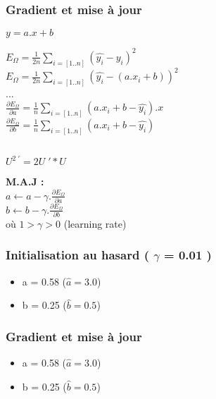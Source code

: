 \begin{frame}
  \frametitle{Gradient et mise à jour}
  \begin{minipage}[l]{0.49\linewidth}
    \begin{center}
      $\boxed{y = a.x+b}$ \\
    \end{center}
    $E_{\Omega} = \frac{1}{2n}\underset{i=[1..n]}{\sum}( \hat{y_i} - y_i )^2$ \\
    $E_{\Omega} = \frac{1}{2n}\underset{i=[1..n]}{\sum}( \hat{y_i} - (a.x_i+b) )^2$ \\
    ... \\
    $\frac{\partial{E_{\Omega}}}{\partial{a}} = \frac{1}{n}\sum_{i=[1..n]}(a.x_i+b - \hat{y_i}).x$ \\
    $\frac{\partial{E_{\Omega}}}{\partial{b}} = \frac{1}{n}\sum_{i=[1..n]}(a.x_i+b - \hat{y_i})$ \\
  \end{minipage}\hfill
  \begin{minipage}[c]{0.49\linewidth}
    $\;$ \\
    $\;$ \\
    $\;$ \\
    \begin{center}
      $\boxed{U^{2\;\prime}=2U\;'*U}$
    \end{center}
  \end{minipage}\hfill
  \begin{center}
    \textbf{M.A.J :} \\
    $\;$ \\
    $a \leftarrow a - \gamma.\frac{\partial{E_{\Omega}}}{\partial{a}}$ \\
    $b \leftarrow b - \gamma.\frac{\partial{E_{\Omega}}}{\partial{b}}$ \\
    $\;$ \\
    où $1 > \gamma > 0$ (learning rate)
  \end{center}
\end{frame}

\begin{frame}
  \frametitle{Initialisation au hasard ( $\gamma$ = 0.01 )}
  \begin{itemize}
  \item a = 0.58 ($\hat{a} = 3.0$)
  \item b = 0.25 ($\hat{b} = 0.5$)
  \end{itemize}
\end{frame}

\begin{frame}
  \frametitle{Gradient et mise à jour}
  \begin{itemize}
  \item a = 0.58 ($\hat{a} = 3.0$)
  \item b = 0.25 ($\hat{b} = 0.5$)
  \end{itemize}
\end{frame}

